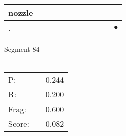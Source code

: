 \documentclass[landscape]{article}
\newcommand{\ssp}{\hspace{2pt}}
\newcommand{\mex}{\cellcolor{g}$\bullet$}
\begin{document}
\begin{tabular}{|l|p{10pt}|p{10pt}|p{10pt}|p{10pt}|p{10pt}|p{10pt}|p{10pt}|p{10pt}|p{10pt}|p{10pt}|}
\hline
\ssp nozzle \ssp&\hspace{2pt}&\hspace{2pt}&\hspace{2pt}&\hspace{2pt}&\hspace{2pt}&\hspace{2pt}&\hspace{2pt}&\hspace{2pt}&\hspace{2pt}&\hspace{2pt}\\
\hline
\ssp \cellcolor{ref9}. \ssp&\hspace{2pt}&\hspace{2pt}&\hspace{2pt}&\hspace{2pt}&\hspace{2pt}&\hspace{2pt}&\hspace{2pt}&\hspace{2pt}&\hspace{2pt}&\hspace{2pt}\mex\\
\hline
\end{tabular}

\vspace{6pt}
\noindent Segment 84\\\\
\noindent\begin{tabular}{lm{12pt}r}
\hline
P:&&0.244\\
R:&&0.200\\
Frag:&&0.600\\
Score:&&0.082\\
\end{tabular}

\newpage
\end{document}
